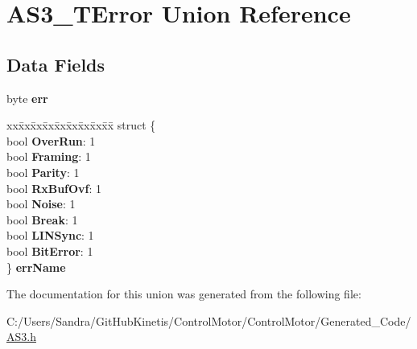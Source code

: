 \hypertarget{union_a_s3___t_error}{}\section{A\+S3\+\_\+\+T\+Error Union Reference}
\label{union_a_s3___t_error}
\subsection*{Data Fields}
\begin{DoxyCompactItemize}
\item 
byte {\bfseries err}\hypertarget{union_a_s3___t_error_aa669805b8205de7e31c3dafa6193025f}{}\label{union_a_s3___t_error_aa669805b8205de7e31c3dafa6193025f}

\item 
\begin{tabbing}
xx\=xx\=xx\=xx\=xx\=xx\=xx\=xx\=xx\=\kill
struct \{\\
\>bool {\bfseries OverRun}: 1\\
\>bool {\bfseries Framing}: 1\\
\>bool {\bfseries Parity}: 1\\
\>bool {\bfseries RxBufOvf}: 1\\
\>bool {\bfseries Noise}: 1\\
\>bool {\bfseries Break}: 1\\
\>bool {\bfseries LINSync}: 1\\
\>bool {\bfseries BitError}: 1\\
\} {\bfseries errName}\hypertarget{union_a_s3___t_error_a92b1de36c5c4a7a5bfa726b17d3b4760}{}\label{union_a_s3___t_error_a92b1de36c5c4a7a5bfa726b17d3b4760}
\\

\end{tabbing}\end{DoxyCompactItemize}


The documentation for this union was generated from the following file\+:\begin{DoxyCompactItemize}
\item 
C\+:/\+Users/\+Sandra/\+Git\+Hub\+Kinetis/\+Control\+Motor/\+Control\+Motor/\+Generated\+\_\+\+Code/\hyperlink{_a_s3_8h}{A\+S3.\+h}\end{DoxyCompactItemize}
